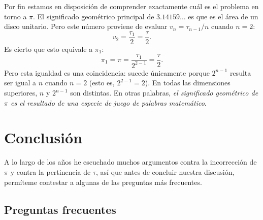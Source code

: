 Por fin estamos en disposición de comprender exactamente cuál es el problema en torno a $\pi$. El significado geométrico principal de $3.14159\ldots$ es que es el área de un disco unitario. Pero este número proviene de evaluar $v_n = \tau_{n-1}/n$ cuando $n=2$:
\[
v_2 = \frac{\tau_1}{2} = \frac{\tau}{2}.
\]
Es cierto que esto equivale a $\pi_1$:
\[
\pi_1 = \pi = \frac{\tau_1}{2^{2-1}} = \frac{\tau}{2}.
\]
Pero esta igualdad es una coincidencia: sucede únicamente porque $2^{n-1}$ resulta ser igual a $n$ cuando $n=2$ (esto es, $2^{2-1} = 2$). En todas las dimensiones superiores, $n$ y $2^{n-1}$ son distintas. En otras palabras, \emph{el significado geométrico de $\pi$ es el resultado de una especie de juego de palabras matemático}.



\section{Conclusión}
\label{sec:conclusion}

A lo largo de los años he escuchado muchos argumentos contra la incorrección de $\pi$ y contra la pertinencia de $\tau$, así que antes de concluir nuestra discusión, permíteme contestar a algunas de las preguntas más frecuentes.

  \subsection{Preguntas frecuentes} %
  \label{sec:faq}


